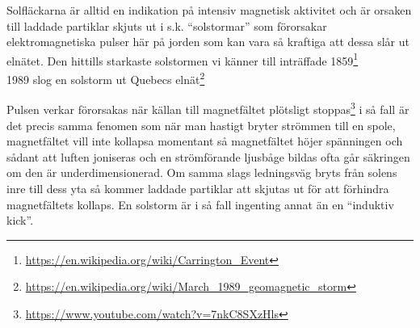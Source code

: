 \documentclass[./exercises.tex]{subfiles}
\begin{document}
\begin{enumerate}
Solfläckarna är alltid en indikation på intensiv magnetisk aktivitet och är orsaken till laddade partiklar skjuts
ut i s.k. ``solstormar''  som förorsakar elektromagnetiska pulser här på jorden som kan vara så kraftiga att dessa slår ut
elnätet. Den hittills starkaste solstormen vi känner till inträffade 1859\footnote{\url{https://en.wikipedia.org/wiki/Carrington_Event}}\\
1989 slog en solstorm ut Quebecs elnät\footnote{\url{https://en.wikipedia.org/wiki/March_1989_geomagnetic_storm}}

Pulsen verkar förorsakas när källan till magnetfältet plötsligt stoppas\footnote{\url{https://www.youtube.com/watch?v=7nkC8SXzHls}}
i så fall är det precis samma fenomen som när man hastigt bryter strömmen till en spole, magnetfältet
vill inte kollapsa momentant så magnetfältet höjer spänningen och sådant att luften joniseras och en strömförande
ljusbåge bildas ofta går säkringen om den är underdimensionerad.
Om samma slags ledningsväg bryts från solens inre till dess yta så kommer laddade partiklar att
skjutas ut för att förhindra magnetfältets kollaps.
 En solstorm är i så fall ingenting annat än en ``induktiv kick''.




 

\end{enumerate}








\end{document}
